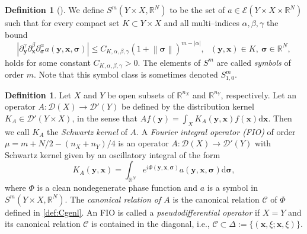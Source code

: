 \documentclass[a4paper,12pt]{amsart}
\numberwithin{equation}{section}
\theoremstyle{plain}
\numberwithin{theorem}{section}
\theoremstyle{definition}
\newtheorem{definition}[theorem]{Definition}
\theoremstyle{remark}
\theoremstyle{remark}
\theoremstyle{remark}
\newcommand{\al}{\alpha}
\newcommand{\bt}{\beta}
\newcommand{\norm}[1]{\left\lVert#1\right\rVert}      %
\newcommand{\dd}{\mathrm{d}}  %
\newcommand{\Cc}{\mathcal{C}}
\newcommand{\Dc}{\mathcal{D}}
\newcommand{\Ec}{\mathcal{E}}
\newcommand{\vx}{{\mathbf{x}}}
\newcommand{\vy}{{\mathbf{y}}}
\newcommand{\vsig}{{\boldsymbol{\sigma}}} %
\begin{document}
 \begin{definition}[{\cite[Definition 7.8.1]{hormanderI}}] \label{ellip}We define
 $S^m(Y \times X, \mathbb{R}^N)$ to be the
set of $a\in \Ec(Y\times X\times \mathbb{R}^N)$ such that for every
compact set $K\subset Y\times X$ and all multi--indices $\al,
\bt, \gamma$ the bound
\[
\left|\partial^{\gamma}_{\vy}\partial^{\bt}_{\vx}\partial^{\al}_{\vsig}a(\vy,\vx,\vsig)\right|\leq
C_{K,\al,\bt,\gamma}(1+\norm{\vsig})^{m-|\al|},\ \ \ (\vy,\vx)\in K,\
\vsig\in\mathbb{R}^N,
\]
holds for some constant $C_{K,\al,\bt,\gamma}>0$. The elements of $S^m$ are called \emph{symbols} of order $m$.  Note
that this symbol class is  sometimes denoted $S^m_{1,0}$.
\end{definition}

\begin{definition}\label{FIOdef}
Let $X$ and $Y$ be open subsets of {$\mathbb{R}^{n_X}$ and $\mathbb{R}^{n_Y}$, respectively.} {Let an operator $A :
\Dc(X)\to \mathcal{D}'(Y)$ be defined by the distribution kernel
$K_A\in \mathcal{D}'(Y\times X)$, in the sense that
$Af(\vy)=\int_{X}K_A(\vy,\vx)f(\vx)\mathrm{d}\vx$. Then we call $K_A$
the \emph{Schwartz kernel} of $A$}. A \emph{Fourier
integral operator (FIO)} of order $\mu = m + N/2 - (n_X+n_Y)/4$ is an operator
$A:\Dc(X)\to \mathcal{D}'(Y)$ with Schwartz kernel given by an
oscillatory integral of the form
\begin{equation} \label{oscint}
K_A(\vy,\vx)=\int_{\mathbb{R}^N}
e^{i\Phi(\vy,\vx,\vsig)}a(\vy,\vx,\vsig) \mathrm{d}\vsig,
\end{equation}
where $\Phi$ is a clean nondegenerate phase function and $a$ is a
symbol in $S^m(Y \times X , \mathbb{R}^N)$. The \emph{canonical
relation of $A$} is the canonical relation $\mathcal{C}$ of $\Phi$ defined in
\eqref{def:Cgenl}. %
An FIO is called a \emph{pseudodifferential operator} if {$X = Y$ and} its canonical relation $\Cc$ is contained in the diagonal, i.e.,
$\Cc \subset \Delta := \{ (\vx,\xi;\vx,\xi)\}$.
\end{definition}

\end{document}
